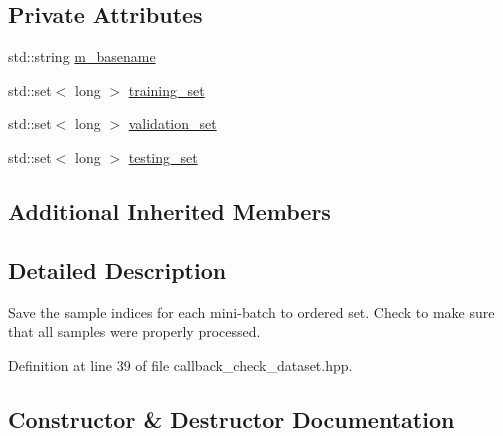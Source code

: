\subsection*{Private Attributes}
\begin{DoxyCompactItemize}
\item 
std\+::string \hyperlink{classlbann_1_1lbann__callback__check__dataset_afb8f8ae1ddbd07bf816ee9e8fa84ca8f}{m\+\_\+basename}
\item 
std\+::set$<$ long $>$ \hyperlink{classlbann_1_1lbann__callback__check__dataset_a22d16efa2ec47759766f2f7478b11059}{training\+\_\+set}
\item 
std\+::set$<$ long $>$ \hyperlink{classlbann_1_1lbann__callback__check__dataset_aab6d04a40d20d1b0bf70f9bfdd85f84c}{validation\+\_\+set}
\item 
std\+::set$<$ long $>$ \hyperlink{classlbann_1_1lbann__callback__check__dataset_a15445849bae3621a3a4364b3ebbbc7f3}{testing\+\_\+set}
\end{DoxyCompactItemize}
\subsection*{Additional Inherited Members}


\subsection{Detailed Description}
Save the sample indices for each mini-\/batch to ordered set. Check to make sure that all samples were properly processed. 

Definition at line 39 of file callback\+\_\+check\+\_\+dataset.\+hpp.



\subsection{Constructor \& Destructor Documentation}
\mbox{\label{classlbann_1_1lbann__callback__check__dataset_a79beae9767b50f7141bc5209ef5d696f}} 
